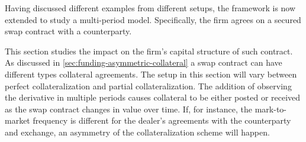 \documentclass[main.tex]{subfiles}
\begin{document}
    Having discussed different examples from different setups,
    the framework is now extended to study a multi-period model.
    Specifically, the firm agrees on a secured swap contract with a counterparty.
    
    This section studies the impact on the firm's capital structure of such contract.
    As discussed in \cref{sec:funding-asymmetric-collateral} a swap contract can have different types collateral agreements.
    The setup in this section will vary between perfect collateralization and partial collateralization.
    The addition of observing the derivative in multiple periods causes collateral to be either posted or received as the swap contract changes in value over time.
    If, for instance, the mark-to-market frequency is different for the dealer's agreements with the counterparty and exchange, an asymmetry of the collateralization scheme will happen.

\end{document}
